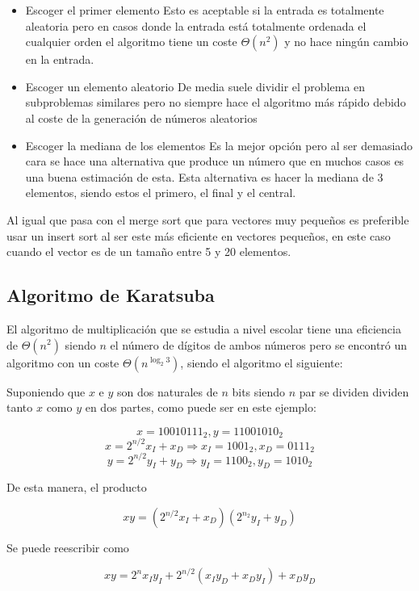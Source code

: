 \begin{itemize}
    \item Escoger el primer elemento
        Esto es aceptable si la entrada es totalmente aleatoria pero en casos
        donde la entrada está totalmente ordenada el cualquier orden el
        algoritmo tiene un coste $\Theta(n^2)$ y no hace ningún cambio en la
        entrada.

    \item Escoger un elemento aleatorio
        De media suele dividir el problema en subproblemas similares pero no
        siempre hace el algoritmo más rápido debido al coste de la generación
        de números aleatorios

    \item Escoger la mediana de los elementos
        Es la mejor opción pero al ser demasiado cara se hace una alternativa
        que produce un número que en muchos casos es una buena estimación de
        esta. Esta alternativa es hacer la mediana de 3 elementos, siendo estos
        el primero, el final y el central.
\end{itemize}

Al igual que pasa con el merge sort que para vectores muy pequeños es
preferible usar un insert sort al ser este más eficiente en vectores pequeños,
en este caso cuando el vector es de un tamaño entre 5 y 20 elementos.

\subsection{Algoritmo de Karatsuba}
El algoritmo de multiplicación que se estudia a nivel escolar tiene una
eficiencia de $\Theta(n^2)$ siendo $n$ el número de dígitos de ambos números
pero se encontró un algoritmo con un coste $\Theta(n^{\log_2 3})$, siendo el
algoritmo el siguiente:

Suponiendo que $x$ e $y$ son dos naturales de $n$ bits siendo $n$ par se
dividen dividen tanto $x$ como $y$ en dos partes, como puede ser en este
ejemplo:

$$x = 10010111_2, y = 11001010_2$$
$$x = 2^{n/2} x_I + x_D \Rightarrow x_I = 1001_2, x_D = 0111_2$$
$$y = 2^{n/2} y_I + y_D \Rightarrow y_I = 1100_2, y_D = 1010_2$$

De esta manera, el producto 

$$xy = (2^{n/2}x_I + x_D)(2^{n_2}y_I + y_D)$$

Se puede reescribir como

$$xy = 2^n x_I y_I + 2^{n/2}(x_I y_D + x_D y_I) + x_D y_D$$

